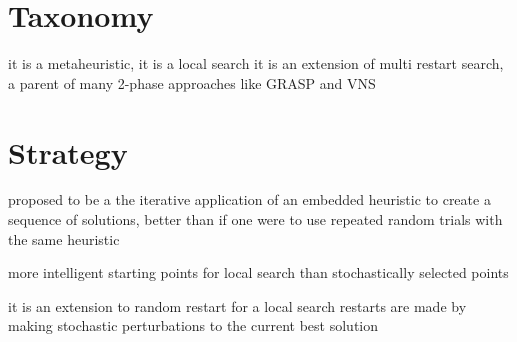 \documentclass[a4paper, 11pt]{article}
\begin{document}
\section{Taxonomy}
\label{sec:taxonomy}
it is a metaheuristic, it is a local search
it is an extension of multi restart search, a parent of many 2-phase approaches like GRASP and VNS

\section{Strategy}
\label{sec:strategy}

proposed to be a the iterative application of an embedded heuristic to create a sequence of solutions, better than if one were to use repeated random trials with the same heuristic

more intelligent starting points for local search than stochastically selected points

it is an extension to random restart for a local search
restarts are made by making stochastic perturbations to the current best solution

\end{document}
